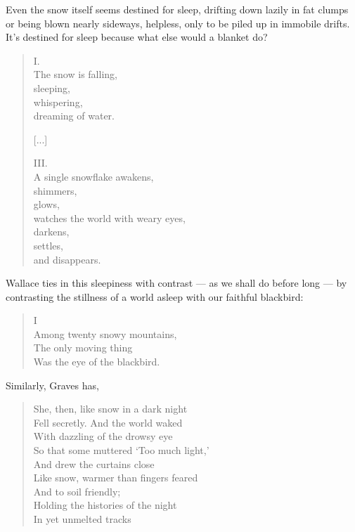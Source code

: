 \documentclass[12pt,oneside]{memoir}
\begin{document}
Even the snow itself seems destined for sleep, drifting down lazily in fat clumps or being blown nearly sideways, helpless, only to be piled up in immobile drifts. It's destined for sleep because what else would a blanket do?

\begin{verse}
I. \\
The snow is falling, \\
sleeping, \\
whispering, \\
dreaming of water.

[...]

III. \\
A single snowflake awakens, \\
shimmers, \\
glows, \\
watches the world with weary eyes, \\
darkens, \\
settles, \\
and disappears.

\parencite{esch}
\end{verse}

Wallace ties in this sleepiness with contrast --- as we shall do before long --- by contrasting the stillness of a world asleep with our faithful blackbird:

\begin{verse}
I \\
Among twenty snowy mountains, \\
The only moving thing \\
Was the eye of the blackbird.

\parencite{blackbird}
\end{verse}

Similarly, Graves has,

\begin{verse}
She, then, like snow in a dark night \\
Fell secretly. And the world waked \\
With dazzling of the drowsy eye \\
So that some muttered `Too much light,' \\
And drew the curtains close \\
Like snow, warmer than fingers feared \\
And to soil friendly; \\
Holding the histories of the night \\
In yet unmelted tracks

\parencite[143]{graves_poems}
\end{verse}
\end{document}
